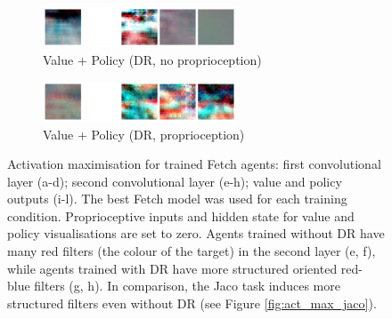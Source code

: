 \begin{figure}
  \begin{subfigure}{0.49\textwidth}
    \centering
    \includegraphics[width=0.63\textwidth]{figures/chapter6/act_max/fetch_dr_noprop_value_policy}
    \caption{Value + Policy (DR, no proprioception)}
  \end{subfigure}
  \begin{subfigure}{0.49\textwidth}
    \centering
    \includegraphics[width=0.63\textwidth]{figures/chapter6/act_max/fetch_dr_prop_value_policy}
    \caption{Value + Policy (DR, proprioception)}
  \end{subfigure}
  \caption{Activation maximisation for trained Fetch agents: first convolutional layer (a-d); second convolutional layer (e-h); value and policy outputs (i-l). The best Fetch model was used for each training condition. Proprioceptive inputs and hidden state for value and policy visualisations are set to zero. Agents trained without DR have many red filters (the colour of the target) in the second layer (e, f), while agents trained with DR have more structured oriented red-blue filters (g, h). In comparison, the Jaco task induces more structured filters even without DR (see Figure \ref{fig:act_max_jaco}).}
  \label{fig:act_max_fetch}
\end{figure}

